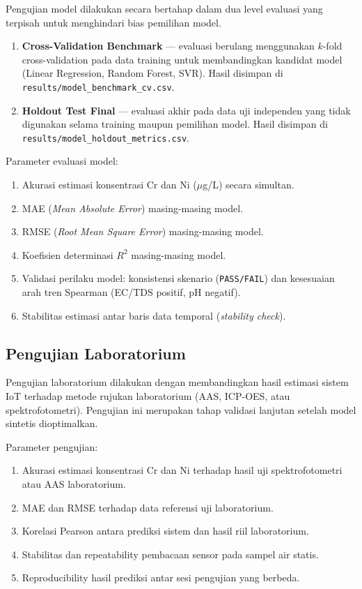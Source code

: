 \documentclass[12pt,a4paper]{article}
\begin{document}
Pengujian model dilakukan secara bertahap dalam dua level evaluasi yang terpisah untuk menghindari bias pemilihan model.

\begin{enumerate}
    \item \textbf{Cross-Validation Benchmark} --- evaluasi berulang menggunakan $k$-fold cross-validation pada data training untuk membandingkan kandidat model (Linear Regression, Random Forest, SVR). Hasil disimpan di \texttt{results/model\_benchmark\_cv.csv}.
    \item \textbf{Holdout Test Final} --- evaluasi akhir pada data uji independen yang tidak digunakan selama training maupun pemilihan model. Hasil disimpan di \texttt{results/model\_holdout\_metrics.csv}.
\end{enumerate}

Parameter evaluasi model:

\begin{enumerate}
    \item Akurasi estimasi konsentrasi Cr dan Ni ($\mu$g/L) secara simultan.
    \item MAE (\textit{Mean Absolute Error}) masing-masing model.
    \item RMSE (\textit{Root Mean Square Error}) masing-masing model.
    \item Koefisien determinasi $R^2$ masing-masing model.
    \item Validasi perilaku model: konsistensi skenario (\texttt{PASS/FAIL}) dan kesesuaian arah tren Spearman (EC/TDS positif, pH negatif).
    \item Stabilitas estimasi antar baris data temporal (\textit{stability check}).
\end{enumerate}

\subsection{Pengujian Laboratorium}

Pengujian laboratorium dilakukan dengan membandingkan hasil estimasi sistem IoT terhadap metode rujukan laboratorium (AAS, ICP-OES, atau spektrofotometri). Pengujian ini merupakan tahap validasi lanjutan setelah model sintetis dioptimalkan.

Parameter pengujian:

\begin{enumerate}
    \item Akurasi estimasi konsentrasi Cr dan Ni terhadap hasil uji spektrofotometri atau AAS laboratorium.
    \item MAE dan RMSE terhadap data referensi uji laboratorium.
    \item Korelasi Pearson antara prediksi sistem dan hasil riil laboratorium.
    \item Stabilitas dan repeatability pembacaan sensor pada sampel air statis.
    \item Reproducibility hasil prediksi antar sesi pengujian yang berbeda.
\end{enumerate}
\end{document}
